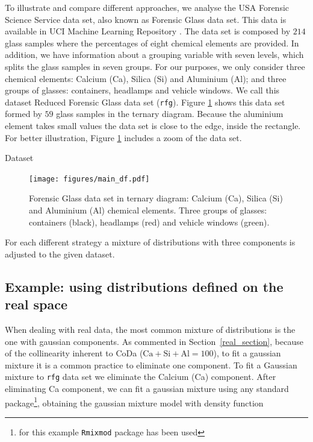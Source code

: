 \documentclass[10pt, a4paper]{article}
\begin{document}
\noindent To illustrate and compare different approaches, we analyse the USA Forensic Science Service data set, also known as Forensic Glass data set. This data is available in UCI Machine Learning Repository \cite{Bache+Lichman:2013}.  The data set is composed by  $214$ glass samples where the percentages of eight chemical elements are provided. In addition, we have information about a grouping variable with seven levels, which splits the glass samples in seven groups. For our purposes, we only consider three chemical elements: Calcium (Ca), Silica (Si) and Aluminium (Al); and three groups of glasses: containers, headlamps and vehicle windows. We call this dataset Reduced Forensic Glass data set (\texttt{rfg}). Figure \ref{fig04} shows this data set formed by $59$ glass samples in the ternary diagram. Because the aluminium element takes small values the data set is close to the edge, inside the rectangle. For better illustration, Figure \ref{fig04} includes a zoom of the data set.


\begin{table}
\centering
\scriptsize

\quad

\label{example_elim_tab}
\caption{Dataset}
\end{table}


\begin{figure}[htbp]
\centering
\texttt{[image: figures/main\_df.pdf]}%
\caption{Forensic Glass data set in ternary diagram: Calcium (Ca), Silica (Si) and Aluminium (Al) chemical elements. Three groups of glasses: containers (black), headlamps (red) and vehicle windows (green).}
\label{fig04}
\end{figure}

For each different strategy a mixture of distributions with three components is adjusted to the given dataset.

\subsection*{Example: using distributions defined on the real space}

When dealing with real data, the most common mixture of distributions is the one with gaussian components. As commented in Section~\ref{real_section}, because of the collinearity inherent to CoDa ($\text{Ca}+\text{Si}+\text{Al} = 100$), to fit a gaussian mixture it is a common practice to eliminate one component. To fit a Gaussian mixture to \texttt{rfg} data set we eliminate the Calcium (Ca) component. After eliminating Ca component, we can fit a gaussian mixture using any standard package\footnote{for this example \texttt{Rmixmod} package has been used}, obtaining the gaussian mixture model with density function
\end{document}
